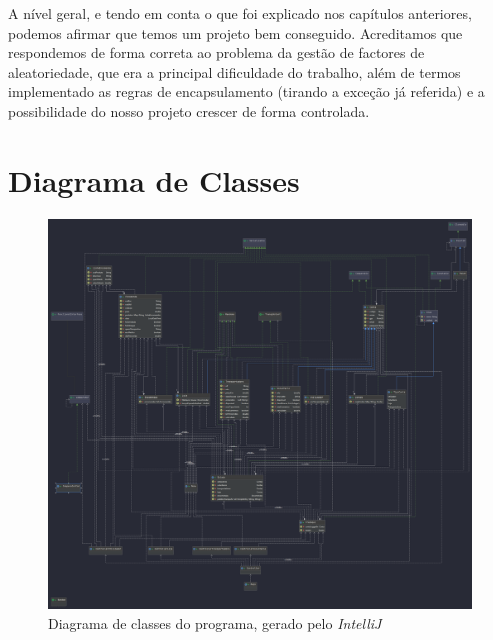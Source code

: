 \documentclass[a4paper]{report}
\begin{document}
	A nível geral, e tendo em conta o que foi explicado nos capítulos anteriores, podemos afirmar que temos um projeto bem conseguido. Acreditamos que respondemos de forma correta ao problema da gestão de factores de aleatoriedade, que era a principal dificuldade do trabalho, além de termos implementado as regras de encapsulamento (tirando a exceção já referida) e a possibilidade do nosso projeto crescer de forma controlada.
	
	\appendix
	
	\chapter{Diagrama de Classes}
	\begin{figure}[H]
		\begin{center}
			\includegraphics[height=0.6\textheight]{DiagramaDeClasses.png}
			\caption{Diagrama de classes do programa, gerado pelo \emph{IntelliJ}}
		\end{center}
	\end{figure}
\end{document}
